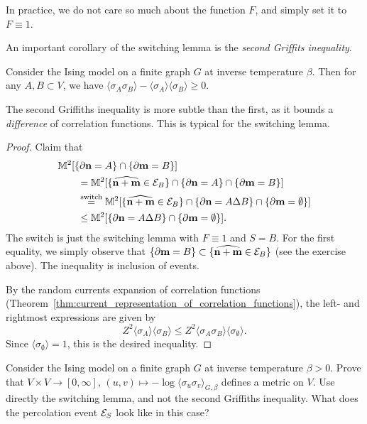 In practice, we do not care so much about the function $F$, and simply set it to $F\equiv 1$.

An important corollary of the switching lemma is the \emph{second Griffits inequality}.

\begin{lemma}
    Consider the Ising model on a finite graph $G$ at inverse temperature $\beta$.
    Then for any $A,B\subset V$, we have
    $\langle\sigma_{A}\sigma_B\rangle-\langle\sigma_A\rangle\langle\sigma_B\rangle\geq 0$.
\end{lemma}

The second Griffiths inequality is more subtle than the first,
as it bounds a \emph{difference} of correlation functions.
This is typical for the switching lemma.

\begin{proof}
    Claim that
    \begin{align}
        &\M^2[\{\partial\n=A\}\cap\{\partial\m=B\}]
        \\
        &\qquad=
        \M^2[\{\widehat{\n+\m} \in \calE_B\}\cap\{\partial\n=A\}\cap\{\partial\m=B\}]
        \\
        &\qquad\stackrel{\text{switch}}=
        \M^2[\{\widehat{\n+\m} \in \calE_B\}\cap\{\partial\n=A\Delta B\}\cap\{\partial\m=\emptyset\}]
        \\
        &\qquad\leq
        \M^2[\{\partial\n=A\Delta B\}\cap\{\partial\m=\emptyset\}].
    \end{align}
    The switch is just the switching lemma with $F\equiv 1$ and $S=B$.
    For the first equality, we simply observe that $\{\partial\mathbf{m}=B\}\subset \{\widehat{\mathbf{n}+\mathbf{m}} \in \mathcal E_B\}$
    (see the exercise above).
    The inequality is inclusion of events.

    By the random currents expansion of correlation functions (Theorem~\ref{thm:current_representation_of_correlation_functions}),
    the left- and rightmost expressions are given by
    \[
        Z^2\langle\sigma_A\rangle\langle\sigma_B\rangle
        \leq
        Z^2\langle\sigma_A\sigma_B\rangle\langle\sigma_\emptyset\rangle.
    \]
    Since $\langle\sigma_\emptyset\rangle=1$, this is the desired inequality.
\end{proof}

\begin{exercise}
    Consider the Ising model on a finite graph $G$
    at inverse temperature $\beta>0$.
    Prove that $V\times V\to [0,\infty],\,
    (u,v)\mapsto-\log\langle\sigma_u\sigma_v\rangle_{G,\beta}$
    defines a metric on $V$.
    Use directly the switching lemma, and not the second Griffiths inequality.
    What does the percolation event $\mathcal E_S$ look like in this case?
\end{exercise}

